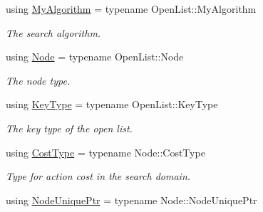 \begin{DoxyCompactItemize}
\item 
using \hyperlink{structslb_1_1core_1_1sb_1_1OpenClosedList_a784b852bae8bcee53dedc40675ab429f}{My\+Algorithm} = typename Open\+List\+::\+My\+Algorithm\hypertarget{structslb_1_1core_1_1sb_1_1OpenClosedList_a784b852bae8bcee53dedc40675ab429f}{}\label{structslb_1_1core_1_1sb_1_1OpenClosedList_a784b852bae8bcee53dedc40675ab429f}

\begin{DoxyCompactList}\small\item\em The search algorithm. \end{DoxyCompactList}\item 
using \hyperlink{structslb_1_1core_1_1sb_1_1OpenClosedList_ab4cf0f882c69f162e0eccf4abe5ad27e}{Node} = typename Open\+List\+::\+Node\hypertarget{structslb_1_1core_1_1sb_1_1OpenClosedList_ab4cf0f882c69f162e0eccf4abe5ad27e}{}\label{structslb_1_1core_1_1sb_1_1OpenClosedList_ab4cf0f882c69f162e0eccf4abe5ad27e}

\begin{DoxyCompactList}\small\item\em The node type. \end{DoxyCompactList}\item 
using \hyperlink{structslb_1_1core_1_1sb_1_1OpenClosedList_a9ffd5756297080af110c9d55b588a34e}{Key\+Type} = typename Open\+List\+::\+Key\+Type\hypertarget{structslb_1_1core_1_1sb_1_1OpenClosedList_a9ffd5756297080af110c9d55b588a34e}{}\label{structslb_1_1core_1_1sb_1_1OpenClosedList_a9ffd5756297080af110c9d55b588a34e}

\begin{DoxyCompactList}\small\item\em The key type of the open list. \end{DoxyCompactList}\item 
using \hyperlink{structslb_1_1core_1_1sb_1_1OpenClosedList_ab79d63d962deef4b9a0e7d9eaa600ed5}{Cost\+Type} = typename Node\+::\+Cost\+Type\hypertarget{structslb_1_1core_1_1sb_1_1OpenClosedList_ab79d63d962deef4b9a0e7d9eaa600ed5}{}\label{structslb_1_1core_1_1sb_1_1OpenClosedList_ab79d63d962deef4b9a0e7d9eaa600ed5}

\begin{DoxyCompactList}\small\item\em Type for action cost in the search domain. \end{DoxyCompactList}\item 
using \hyperlink{structslb_1_1core_1_1sb_1_1OpenClosedList_a2e2e18ca368c353ff032fa3f3dd8f1e9}{Node\+Unique\+Ptr} = typename Node\+::\+Node\+Unique\+Ptr\hypertarget{structslb_1_1core_1_1sb_1_1OpenClosedList_a2e2e18ca368c353ff032fa3f3dd8f1e9}{}\label{structslb_1_1core_1_1sb_1_1OpenClosedList_a2e2e18ca368c353ff032fa3f3dd8f1e9}


\end{DoxyCompactItemize}
